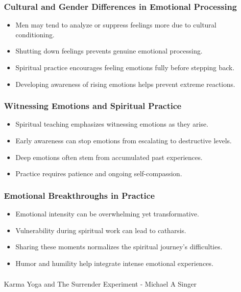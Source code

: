 \begin{frame}[fragile]\frametitle{Cultural and Gender Differences in Emotional Processing}
  \begin{itemize}
    \item Men may tend to analyze or suppress feelings more due to cultural conditioning.
    \item Shutting down feelings prevents genuine emotional processing.
    \item Spiritual practice encourages feeling emotions fully before stepping back.
    \item Developing awareness of rising emotions helps prevent extreme reactions.
  \end{itemize}
\end{frame}

\begin{frame}[fragile]\frametitle{Witnessing Emotions and Spiritual Practice}
  \begin{itemize}
    \item Spiritual teaching emphasizes witnessing emotions as they arise.
    \item Early awareness can stop emotions from escalating to destructive levels.
    \item Deep emotions often stem from accumulated past experiences.
    \item Practice requires patience and ongoing self-compassion.
  \end{itemize}
\end{frame}

\begin{frame}[fragile]\frametitle{Emotional Breakthroughs in Practice}
  \begin{itemize}
    \item Emotional intensity can be overwhelming yet transformative.
    \item Vulnerability during spiritual work can lead to catharsis.
    \item Sharing these moments normalizes the spiritual journey's difficulties.
    \item Humor and humility help integrate intense emotional experiences.
  \end{itemize}
\end{frame}

\begin{frame}[fragile]\frametitle{}
\begin{center}
{\Large Karma Yoga and The Surrender Experiment - Michael A Singer}

\end{center}
\end{frame}

